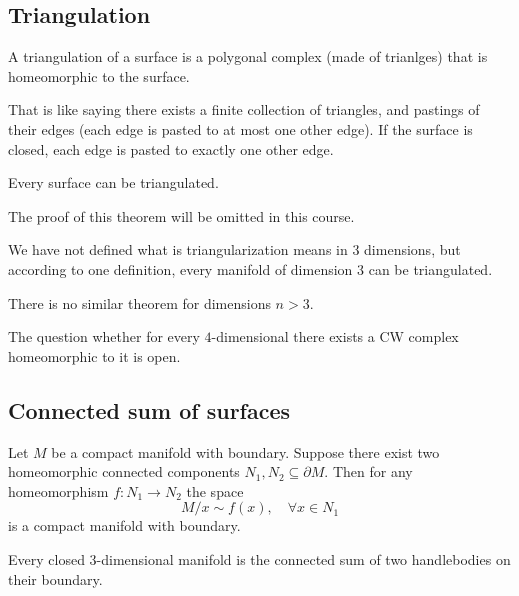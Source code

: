 \documentclass[11pt,a4paper]{article}
\begin{document}
\subsection{Triangulation}
\begin{definition}
  A triangulation of a surface is a polygonal complex (made of trianlges)
  that is homeomorphic to the surface.
\end{definition}
\begin{remark}
  That is like saying there exists a finite collection of triangles, and
  pastings of their edges (each edge is pasted to at most one other edge).
  If the surface is closed, each edge is pasted to exactly one other edge.
\end{remark}

\begin{theorem}[Rad\'o]
  Every surface can be triangulated.
\end{theorem}
The proof of this theorem will be omitted in this course.
\begin{remark}
  We have not defined what is triangularization means in $3$ dimensions,
  but according to one definition, every manifold of dimension $3$ can be
  triangulated.
\end{remark}
\begin{remark}
  There is no similar theorem for dimensions $n > 3$.
\end{remark}
\begin{remark}
  The question whether for every $4$-dimensional there exists a CW complex
  homeomorphic to it is open.
\end{remark}

\subsection{Connected sum of surfaces}
\begin{exercise}
  Let $M$ be a compact manifold with boundary.
  Suppose there exist two homeomorphic connected components
  $N_1,N_2 \subseteq \partial M$.
  Then for any homeomorphism $f \colon N_1 \to N_2$ the space
  \[
    {M}/{x \sim f(x)}, \quad \forall x \in N_1
  \]
  is a compact manifold with boundary.
\end{exercise}

\begin{remark}
  Every closed $3$-dimensional manifold is the connected sum of two
  handlebodies on their boundary.
\end{remark}
\end{document}
